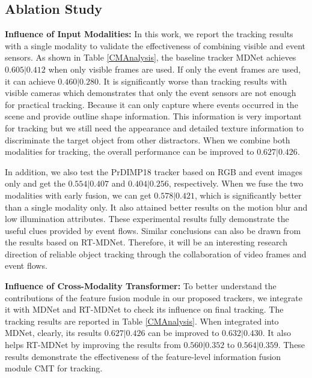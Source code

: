 \documentclass[journal]{IEEEtran}
\begin{document}
 


 



\subsection{Ablation Study} 


\noindent 
\textbf{Influence of Input Modalities:} 
In this work, we report the tracking results with a single modality to validate the effectiveness of combining visible and event sensors. As shown in Table \ref{CMAnalysis}, the baseline tracker MDNet achieves $0.605|0.412$ when only visible frames are used. If only the event frames are used, it can achieve $0.460|0.280$. It is significantly worse than tracking results with visible cameras which demonstrates that only the event sensors are not enough for practical tracking. Because it can only capture where events occurred in the scene and provide outline shape information. This information is very important for tracking but we still need the appearance and detailed texture information to discriminate the target object from other distractors. When we combine both modalities for tracking, the overall performance can be improved to $0.627|0.426$. 

In addition, we also test the PrDIMP18 tracker based on RGB and event images only and get the $0.554|0.407$ and $0.404|0.256$, respectively. When we fuse the two modalities with early fusion, we can get $0.578|0.421$, which is significantly better than a single modality only. It also attained better results on the motion blur and low illumination attributes. 
These experimental results fully demonstrate the useful clues provided by event flows. Similar conclusions can also be drawn from the results based on RT-MDNet. Therefore, it will be an interesting research direction of reliable object tracking through the collaboration of video frames and event flows. 


\noindent 
\textbf{Influence of Cross-Modality Transformer:}  
To better understand the contributions of the feature fusion module in our proposed trackers, we integrate it with MDNet and RT-MDNet to check its influence on final tracking. The tracking results are reported in Table \ref{CMAnalysis}. When integrated into MDNet, clearly, its results $0.627|0.426$ can be improved to $0.632|0.430$. It also helps RT-MDNet by improving the results from $0.560|0.352$ to $0.564|0.359$. These results demonstrate the effectiveness of the feature-level information fusion module CMT for tracking. 
\end{document}
